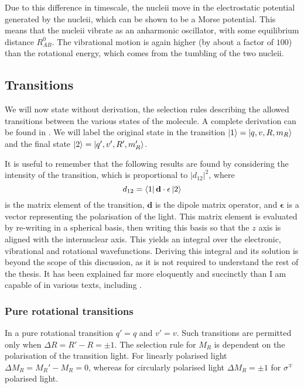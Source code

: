 Due to this difference in timescale, the nucleii move in the electrostatic potential
generated by the nucleii, which can be shown to be a Morse potential. This
means that the nucleii vibrate as an anharmonic oscillator, with some
equilibrium distance $R_{AB}^0$. The vibrational motion is again higher (by
about a factor of $100$) than the rotational energy, which comes from the
tumbling of the two nucleii.


\subsection{Transitions}


We will now state without derivation, the selection rules describing the
allowed transitions between the various states of the molecule. A complete
derivation can be found in \inlineref{}. We will label the original state in
the transition $\ket{1} = \ket{q, v, R, m_R}$ and the final state $\ket{2} =
\ket{q', v', R', m_R'}$.

It is useful to remember that the following results are found by considering
the intensity of the transition, which is proportional to $|d_{12}|^2$, where
%
\begin{equation}
  d_{12} = \bra{1}\mathbf{d}\cdot\mathbf{\epsilon}\ket{2}
\end{equation}
%
is the matrix element of the transition, $\mathbf{d}$ is the dipole matrix
operator, and $\mathbf{\epsilon}$ is a vector representing the polarisation of
the light. This matrix element is evaluated by re-writing in a spherical basis,
then writing this basis so that the $z$ axis is aligned with the internuclear
axis. This yields an integral over the electronic, vibrational and rotational
wavefunctions. Deriving this integral and its solution is beyond the scope of
this discussion, as it is not required to understand the rest of the thesis. It
has been explained far more eloquently and succinctly than I am capable of in
various texts, including .

\subsubsection{Pure rotational transitions}

In a pure rotational transition $q'=q$ and $v'=v$. Such transitions are
permitted only when $\Delta R = R' - R = \pm1$. The selection rule for $M_R$ is
dependent on the polarisation of the transition light. For linearly polarised
light $\Delta M_R = M_R' - M_R =
0$, whereas for circularly polarised light $\Delta M_R =  \pm1$ for
$\sigma^\mp$ polarised light.

